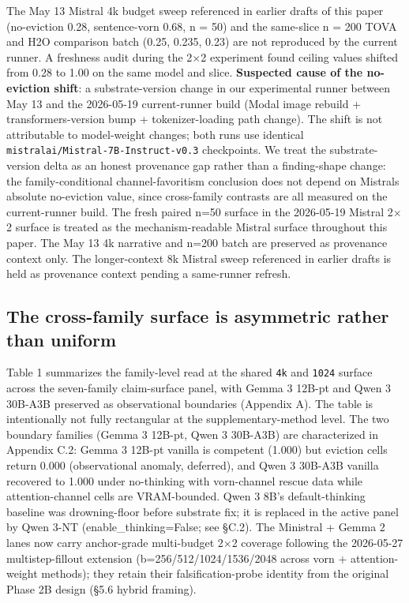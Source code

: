 \documentclass[10pt]{article}
\begin{document}
The May 13 Mistral 4k budget sweep referenced in earlier drafts of this
paper (no-eviction 0.28, sentence-vorn 0.68, n = 50) and the same-slice
n = 200 TOVA and H2O comparison batch (0.25, 0.235, 0.23)
are not reproduced by the current runner. A freshness audit during the
2$\times$2 experiment found ceiling values shifted from 0.28 to 1.00 on the
same model and slice. \textbf{Suspected cause of the no-eviction shift}:
a substrate-version change in our experimental runner between May 13 and
the 2026-05-19 current-runner build (Modal image rebuild +
transformers-version bump + tokenizer-loading path change). The shift is
not attributable to model-weight changes; both runs use identical
\texttt{mistralai/\allowbreak{}Mistral-7B-Instruct-v0.\allowbreak{}3} checkpoints. We treat the
substrate-version delta as an honest provenance gap rather than a
finding-shape change: the family-conditional channel-favoritism
conclusion does not depend on Mistral\textquotesingle s absolute
no-eviction value, since cross-family contrasts are all measured on the
current-runner build. The fresh paired n=50 surface in the 2026-05-19
Mistral 2$\times$2 surface is treated as the mechanism-readable Mistral surface
throughout this paper. The May 13 4k narrative and n=200 batch are
preserved as provenance context only. The longer-context 8k Mistral
sweep referenced in earlier drafts is held as provenance context pending
a same-runner refresh.

\subsection{The cross-family surface is asymmetric rather than uniform}\label{52-the-cross-family-surface-is-asymmetric-rather-than-uniform}

Table 1 summarizes the family-level read at the shared \texttt{4k} and
\texttt{1024} surface across the seven-family claim-surface panel,
with Gemma 3 12B-pt and Qwen 3 30B-A3B preserved as observational
boundaries (Appendix A). The table is intentionally not fully
rectangular at the supplementary-method level. The two boundary
families (Gemma 3 12B-pt, Qwen 3 30B-A3B) are characterized in
Appendix C.2: Gemma 3 12B-pt vanilla is competent (1.000) but
eviction cells return 0.000 (observational anomaly, deferred), and
Qwen 3 30B-A3B vanilla recovered to 1.000 under no-thinking with
vorn-channel rescue data while attention-channel cells are
VRAM-bounded. Qwen 3 8B's default-thinking baseline was drowning-floor
before substrate fix; it is replaced in the active panel by Qwen 3-NT
(enable\_thinking=False; see \S{}C.2). The Ministral + Gemma 2 lanes now
carry anchor-grade multi-budget 2$\times$2 coverage following the 2026-05-27
multistep-fillout extension (b=256/512/1024/1536/2048 across vorn +
attention-weight methods); they retain their falsification-probe
identity from the original Phase 2B design (\S{}5.6 hybrid framing).
\end{document}
